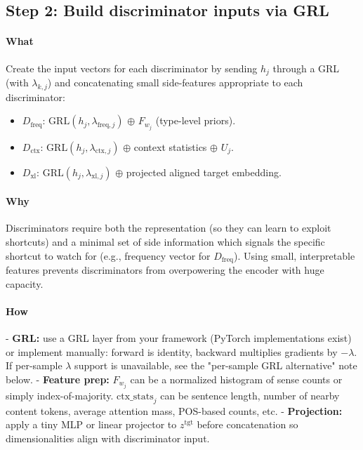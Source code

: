 \documentclass[11pt]{article}
\begin{document}
\subsection*{Step 2: Build discriminator inputs via GRL}
\paragraph{What}
Create the input vectors for each discriminator by sending $h_j$ through a GRL (with $\lambda_{k,j}$) and concatenating small side-features appropriate to each discriminator:
\begin{itemize}
  \item $D_{\text{freq}}$: $\mathrm{GRL}(h_j,\lambda_{\text{freq},j})$ \(\oplus\) $F_{w_j}$ (type-level priors).
  \item $D_{\text{ctx}}$: $\mathrm{GRL}(h_j,\lambda_{\text{ctx},j})$ \(\oplus\) context statistics \(\oplus\) $U_j$.
  \item $D_{\text{xl}}$: $\mathrm{GRL}(h_j,\lambda_{\text{xl},j})$ \(\oplus\) projected aligned target embedding.
\end{itemize}

\paragraph{Why}
Discriminators require both the representation (so they can learn to exploit shortcuts) and a minimal set of side information which signals the specific shortcut to watch for (e.g., frequency vector for $D_{\text{freq}}$). Using small, interpretable features prevents discriminators from overpowering the encoder with huge capacity.

\paragraph{How}
- \textbf{GRL:} use a GRL layer from your framework (PyTorch implementations exist) or implement manually: forward is identity, backward multiplies gradients by $-\lambda$. If per-sample $\lambda$ support is unavailable, see the "per-sample GRL alternative" note below.  
- \textbf{Feature prep:} $F_{w_j}$ can be a normalized histogram of sense counts or simply index-of-majority. $\text{ctx\_stats}_j$ can be sentence length, number of nearby content tokens, average attention mass, POS-based counts, etc.  
- \textbf{Projection:} apply a tiny MLP or linear projector to $z^{\mathrm{tgt}}$ before concatenation so dimensionalities align with discriminator input.
\end{document}
